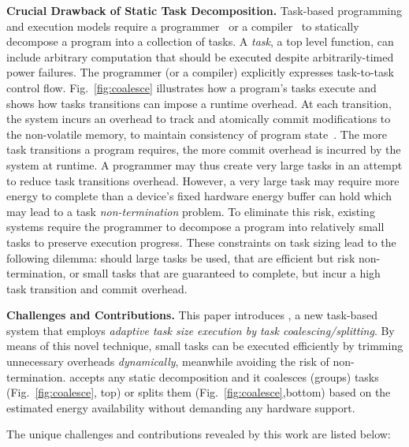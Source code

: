 \noindent\textbf{Crucial Drawback of Static Task Decomposition.} 
Task-based programming and execution models require a
programmer~\cite{alpaca,chain} or a compiler~\cite{baghsorkhi_cgo_2018} to
statically decompose a program into a collection of tasks. A \emph{task}, a top level function, can
include arbitrary computation that should be executed despite arbitrarily-timed power failures.
The programmer (or a compiler) explicitly expresses task-to-task control flow.
Fig.~\ref{fig:coalesce} illustrates how a program's tasks execute and shows how tasks transitions can impose a runtime overhead. At each transition, the system incurs an overhead to track and atomically commit modifications to the non-volatile memory, to maintain consistency of program state~\cite{chain,alpaca}. The more task transitions a program requires, the more commit overhead is incurred by the system at runtime.
%
A programmer may thus create very large tasks in an attempt to reduce task transitions
overhead. However, a very large task may require more energy to complete than a device's fixed hardware energy
buffer can hold which may lead to a task \emph{non-termination} problem. To eliminate this risk,
existing systems require the programmer to decompose a program into relatively small tasks to preserve execution progress. These constraints on task sizing lead to the following dilemma: should large tasks be used, that are efficient but risk non-termination, or small tasks that are guaranteed to complete, but incur a high task transition and commit overhead. 

\noindent\textbf{Challenges and Contributions.}
This paper introduces \sys, a new task-based system that employs \emph{adaptive task size execution by task coalescing/splitting}. By means of this novel technique, small tasks can be executed efficiently by trimming unnecessary overheads \emph{dynamically}, meanwhile avoiding the risk of non-termination. \sys accepts any static decomposition and it coalesces (groups) tasks (Fig.~\ref{fig:coalesce}, top) or splits them (Fig.~\ref{fig:coalesce},bottom) based on the estimated energy availability without demanding any hardware support. 

The unique challenges and contributions revealed by this work are listed below:

